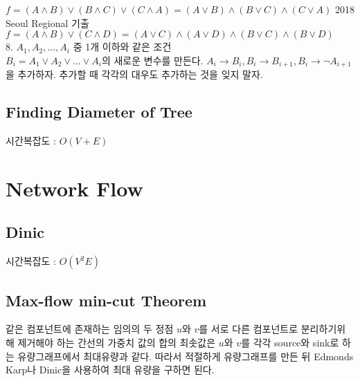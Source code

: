 \documentclass[10pt,landscape,a4paper,twocolumn]{article}
\begin{document}
$f=(A \land B) \lor (B \land C) \lor (C \land A) = (A \lor B) \land (B \lor C) \land (C \lor A)$ \hspace{1em} 2018 Seoul Regional 기출\\
$f=(A \land B) \lor (C \land D) = (A \lor C) \land (A \lor D) \land (B \lor C) \land (B \lor D)$\\
8. $A_1, A_2, ..., A_i$ 중 1개 이하와 같은 조건\\
$B_i=A_1 \lor A_2 \lor ... \lor A_i$의 새로운 변수를 만든다. $A_i \rightarrow B_i, B_i \rightarrow B_{i+1}, B_i \rightarrow \lnot A_{i+1}$을 추가하자. 추가할 때 각각의 대우도 추가하는 것을 잊지 말자.\\



\subsection{Finding Diameter of Tree}
시간복잡도 : $O(V+E)$



\section{Network Flow}
\subsection{Dinic}
시간복잡도 : $O(V^2E)$


\subsection{Max-flow min-cut Theorem}
\hspace{1em}같은 컴포넌트에 존재하는 임의의 두 정점 $u$와 $v$를 서로 다른 컴포넌트로 분리하기위해 제거해야 하는 간선의 가중치 값의 합의 최솟값은 $u$와 $v$를 각각 source와 sink로 하는 유량그래프에서 최대유량과 같다. 따라서 적절하게 유량그래프를 만든 뒤 Edmonds Karp나 Dinic을 사용하여 최대 유량을 구하면 된다.\\
\end{document}
